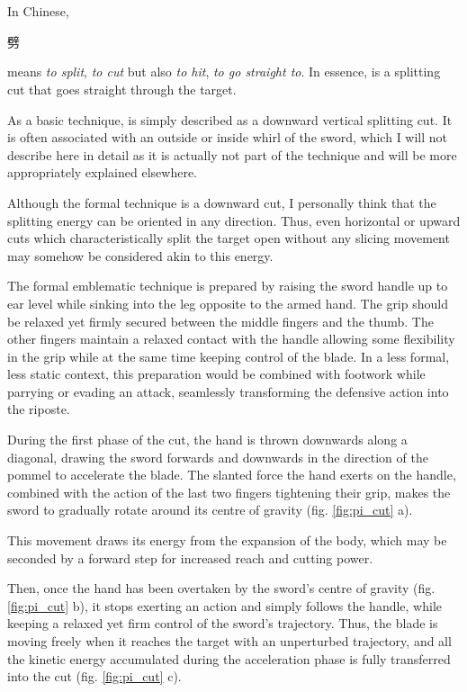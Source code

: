 
\section{\Pi{}}
In Chinese, \Pi{} \begin{CJK*}{UTF8}{bsmi}劈\end{CJK*} means \textit{to split}, \textit{to cut} but also \textit{to hit}, \textit{to go straight to}. In essence, \Pi{} is a splitting cut that goes straight through the target.

As a basic technique, \Pi{} is simply described as a downward vertical splitting cut. It is often associated with an outside or inside whirl of the sword, which I will not describe here in detail as it is actually not part of the \Pi{} technique and will be more appropriately explained elsewhere.

Although the formal \Pi{} technique is a downward cut,  I personally think that the \Pi{} splitting energy can be oriented in any direction. Thus, even horizontal or upward cuts which characteristically split the target open without any slicing movement may somehow be considered akin to this energy.

The formal emblematic \Pi{} technique is prepared by raising the sword handle up to ear level while sinking into the leg opposite to the armed hand. The grip should be relaxed yet firmly secured between the middle fingers and the thumb. The other fingers maintain a relaxed contact with the handle allowing some flexibility in the grip while at the same time keeping control of the blade. 
In a less formal, less static context, this preparation would be combined with footwork while parrying or evading an attack, seamlessly transforming the defensive action into the riposte.

During the first phase of the cut, the hand is thrown downwards along a diagonal, drawing the sword forwards and downwards in the direction of the pommel to accelerate the blade. The slanted force the hand exerts on the handle, combined with the action of the last two fingers tightening their grip, makes the sword to gradually rotate around its centre of gravity (fig. \ref{fig:pi_cut} a).

This movement draws its energy from the expansion of the body, which may be seconded by a forward step for increased reach and cutting power. 

Then, once the hand has been overtaken by the sword's centre of gravity (fig. \ref{fig:pi_cut} b), it stops exerting an action and simply follows the handle, while keeping a relaxed yet firm control of the sword's trajectory. Thus, the blade is moving freely when it reaches the target with an unperturbed trajectory, and all the kinetic energy accumulated during the acceleration phase is fully transferred into the cut (fig. \ref{fig:pi_cut} c).

